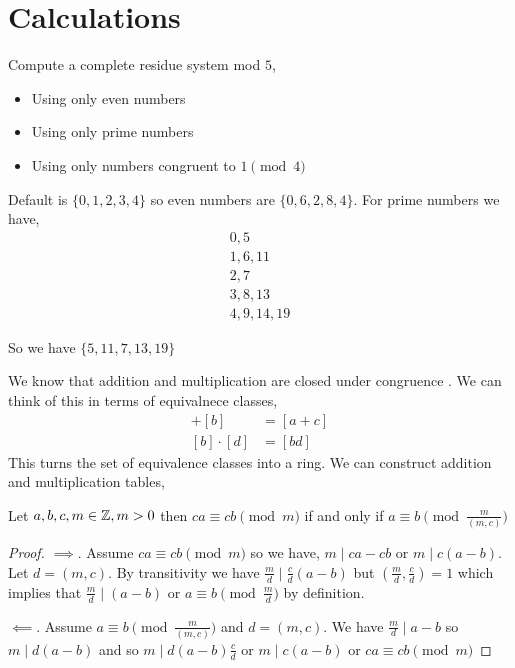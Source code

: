 
\section{Calculations}

\begin{eg}
    Compute a complete residue system mod $5$, 
    \begin{itemize}
        \item Using only even numbers
        \item Using only prime numbers
        \item Using only numbers congruent to $1 \pmod 4$
    \end{itemize}

    Default is $\{0, 1, 2, 3, 4\}$  so even numbers are $\{0, 6, 2, 8, 4\}$. For prime numbers we have,
    \begin{align*}
        0, 5\\ 
        1, 6, 11\\
        2, 7\\
        3, 8, 13\\
        4, 9, 14, 19
    \end{align*}

    So we have $\{5, 11, 7, 13, 19\} $
\end{eg}

\vspace{1em}
\hline
\vspace{1em}


\begin{note}
    
    We know that addition and multiplication are closed under congruence . We can think of this in terms of equivalnece classes, 
    \begin{align*}
        [a] + [b] &= [a + c]\\
        [b] \cdot [d] &= [bd]
    \end{align*}
    This turns the set of equivalence classes into a ring. We can construct addition and multiplication tables,
\end{note}

\begin{prop}
    Let $a, b, c, m\in \mathbb{Z}, m> 0$ then $ca \equiv c b \pmod m$ if and only if $a \equiv b \pmod {\frac{m}{(m, c)}}$
\end{prop}
\begin{proof}
    $\implies$. Assume $ca \equiv c b \pmod m$ so we have, $m \mid ca - c b$ or  $m \mid c( a - b)$. Let $d = (m, c)$. By transitivity we have  $\frac{m}{d} \mid \frac{c}{d} (a - b)$ but $(\frac{m}{d}, \frac{c}{d}) = 1$ which implies that $\frac{m}{d} \mid (a - b)$ or $ a \equiv b \pmod {\frac{m}{d}}$ by definition. 

    \vspace{1em}
    
    $\impliedby$. Assume  $a \equiv b \pmod {\frac{m}{(m,c)}}$ and $d = (m, c)$. We have  $\frac{m}{d} \mid  a -b$ so $m \mid d(a - b)$ and so  $m \mid d (a - b ) \frac{c}{d}$ or $m \mid c(a - b)$ or  $ca \equiv c b \pmod m$
\end{proof}


